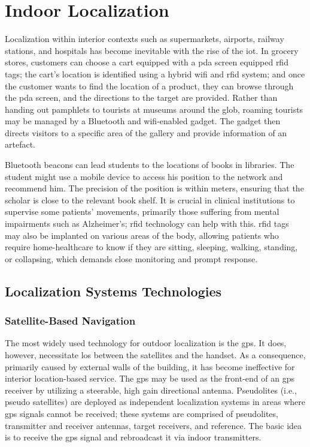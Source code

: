 \chapter{Indoor Localization}

Localization within interior contexts such as supermarkets, airports, railway stations, and hospitals has become inevitable with the rise of the \ac{iot}.
In grocery stores, customers can choose a cart equipped with a \ac{pda} screen equipped \ac{rfid} tags;
the cart's location is identified using a hybrid \ac{wifi} and \ac{rfid} system;
and once the customer wants to find the location of a product, they can browse through the \ac{pda} screen, and the directions to the target are provided\cite{kourouthanassis2001last}.
Rather than handing out pamphlets to tourists at museums around the glob, roaming tourists may be managed by a Bluetooth and \ac{wifi}-enabled gadget.
The gadget then directs visitors to a specific area of the gallery and provide information of an artefact.

Bluetooth beacons can lead students to the locations of books in libraries.
The student might use a mobile device to access his position to the network and recommend him.
The precision of the position is within meters, ensuring that the scholar is close to the relevant book shelf\cite{hahn2017indoor}.
It is crucial in clinical institutions to supervise some patients' movements, primarily those suffering from mental impairments such as Alzheimer's; \ac{rfid} technology can help with this\cite{calderoni2015indoor}.
\Ac{rfid} tags may also be implanted on various areas of the body, allowing patients who require home-healthcare to know if they are sitting, sleeping, walking, standing, or collapsing, which demands close monitoring and prompt response\cite{shuaieb2020rfid}.

\section{Localization Systems Technologies}

\subsection{Satellite-Based Navigation}
The most widely used technology for outdoor localization is the \ac{gps}.
It does, however, necessitate \acf{los} between the satellites and the handset.
As a consequence, primarily caused by external walls of the building, it has become ineffective for interior location-based service.
The \ac{gps} may be used as the front-end of an \ac{gps} receiver by utilizing a steerable, high gain directional antenna.
Pseudolites (i.e., pseudo satellites) are deployed as independent localization systems in areas where \ac{gps} signals cannot be received;
these systems are comprised of pseudolites, transmitter and receiver antennas, target receivers, and reference.
The basic idea is to receive the \ac{gps} signal and rebroadcast it via indoor transmitters\cite{xu2015new}.

